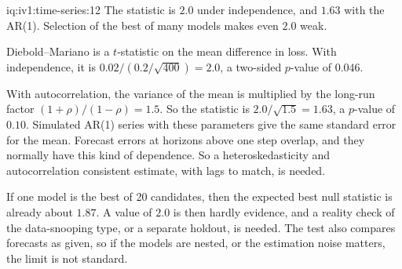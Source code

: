 \begin{solution}{iq:iv1:time-series:12}
The statistic is $2.0$ under independence, and $1.63$ with the AR(1). Selection of the best of many models makes even $2.0$ weak.

Diebold--Mariano is a $t$-statistic on the mean difference in loss. With independence, it is $0.02/(0.2/\sqrt{400}) = 2.0$, a two-sided $p$-value of $0.046$.

With autocorrelation, the variance of the mean is multiplied by the long-run factor $(1 + \rho)/(1 - \rho) = 1.5$. So the statistic is $2.0/\sqrt{1.5} = 1.63$, a $p$-value of $0.10$. Simulated AR(1) series with these parameters give the same standard error for the mean. Forecast errors at horizons above one step overlap, and they normally have this kind of dependence. So a heteroskedasticity and autocorrelation consistent estimate, with lags to match, is needed.

If one model is the best of 20 candidates, then the expected best null statistic is already about $1.87$. A value of $2.0$ is then hardly evidence, and a reality check of the data-snooping type, or a separate holdout, is needed. The test also compares forecasts as given, so if the models are nested, or the estimation noise matters, the limit is not standard.



\end{solution}

